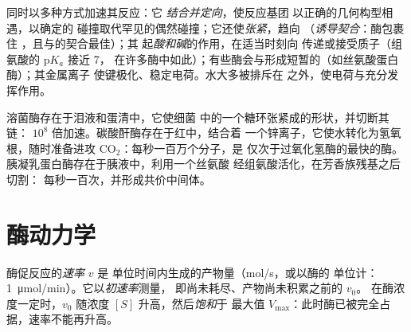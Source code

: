 \begin{proposition}[活性位点的工作方式]\label{prop:b1:enzymes:mechanisms}
同时以多种方式加速其反应：它
\emph{结合并定向}，使反应基团
以正确的几何构型相遇，以确定的
碰撞取代罕见的偶然碰撞；它还使\emph{张紧}，趋向
（\emph{诱导契合}：酶包裹住
，且与的契合最佳）；其
起\emph{酸和碱}的作用，在适当时刻向
传递或接受质子（组氨酸的 p$K_a$ 接近 7，
在许多酶中如此）；有些酶会与形成短暂的\emph{}（如丝氨酸蛋白酶）；其金属离子
使键极化、稳定电荷。水大多被排斥在
之外，使电荷与充分发挥作用。
\end{proposition}

\begin{example}[三种酶]\label{ex:b1:enzymes:three}
溶菌酶存在于泪液和蛋清中，它使细菌
中的一个糖环张紧成的形状，并切断其链：
$10^8$ 倍加速。碳酸酐酶存在于红中，结合着
一个锌离子，它使水转化为氢氧根，随时准备进攻
$\mathrm{CO_2}$：每秒一百万个分子，是
仅次于过氧化氢酶的最快的酶。胰凝乳蛋白酶存在于胰液中，利用一个丝氨酸
经组氨酸活化，在芳香族残基之后切割：
每秒一百次，并形成共价中间体。
\end{example}

\section{酶动力学}

\begin{definition}[初速率，饱和]\label{def:b1:enzymes:rate}
酶促反应的\emph{速率} $v$ 是
单位时间内生成的产物量（\unit{mol/s}，或以酶的
单位计：\qty{1}{\micro mol/min}）。它以\emph{初速率}测量，
即尚未耗尽、产物尚未积累之前的 $v_0$。
在酶浓度一定时，$v_0$ 随浓度
$[S]$ 升高，然后\emph{饱和}于
最大值 $V_{\max}$：此时酶已被完全占据，速率不能再升高。
\end{definition}

